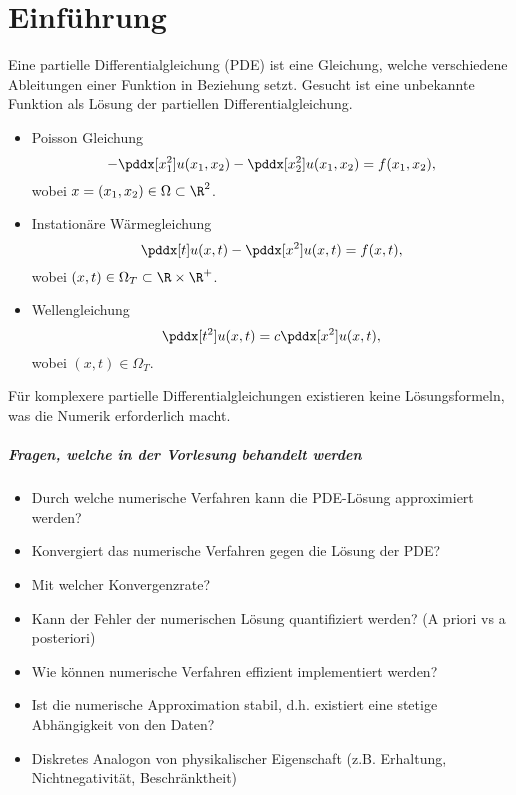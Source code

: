 \chapter{Einführung}


Eine partielle Differentialgleichung (PDE) ist eine Gleichung, welche verschiedene Ableitungen einer Funktion in Beziehung setzt.
Gesucht ist eine unbekannte Funktion als Lösung der partiellen Differentialgleichung.

\begin{ex*}
	\begin{itemize}
		\item
			Poisson Gleichung
			\[
				- \pddx[x_1^2] u(x_1,x_2) - \pddx[x_2^2] u(x_1, x_2) = f(x_1, x_2),
			\]
			wobei $x = (x_1, x_2) \in \Omega \subset \R^2$.
		\item
			Instationäre Wärmegleichung
			\[
				\pddx[t] u(x,t) - \pddx[x^2] u(x,t) = f(x, t),
			\]
			wobei $(x, t) \in \Omega_T \subset \R \times \R^+$.
		\item
			Wellengleichung
			\[
				\pddx[t^2] u(x, t) = c \pddx[x^2] u(x,t),
			\]
			wobei $(x,t) \in \Omega_T$.
	\end{itemize}
\end{ex*}

Für komplexere partielle Differentialgleichungen existieren keine Lösungsformeln, was die Numerik erforderlich macht.

\paragraph{Fragen, welche in der Vorlesung behandelt werden}

\begin{itemize}
	\item
		Durch welche numerische Verfahren kann die PDE-Lösung approximiert werden?
	\item
		Konvergiert das numerische Verfahren gegen die Lösung der PDE?
	\item
		Mit welcher Konvergenzrate?
	\item
		Kann der Fehler der numerischen Lösung quantifiziert werden? (A priori vs a posteriori)
	\item
		Wie können numerische Verfahren effizient implementiert werden?
	\item
		Ist die numerische Approximation stabil, d.h. existiert eine stetige Abhängigkeit von den Daten?
	\item
		Diskretes Analogon von physikalischer Eigenschaft (z.B. Erhaltung, Nichtnegativität, Beschränktheit)
\end{itemize}


